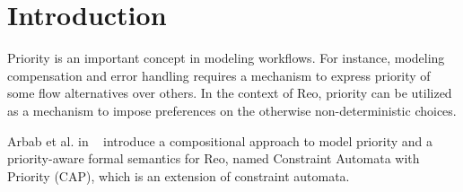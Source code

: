 \section{Introduction}
\label{sec:priointro}
Priority is an important concept in modeling workflows. For instance, modeling compensation and error handling requires a mechanism to express priority of some flow alternatives over others. In the context of Reo, priority can be utilized as a mechanism to impose preferences on the otherwise non-deterministic choices.

%
%
%

Arbab et al. in ~\cite{priority} introduce a compositional approach to model priority and a priority-aware formal semantics for Reo, named Constraint Automata with Priority (CAP), which is an extension of constraint automata.

